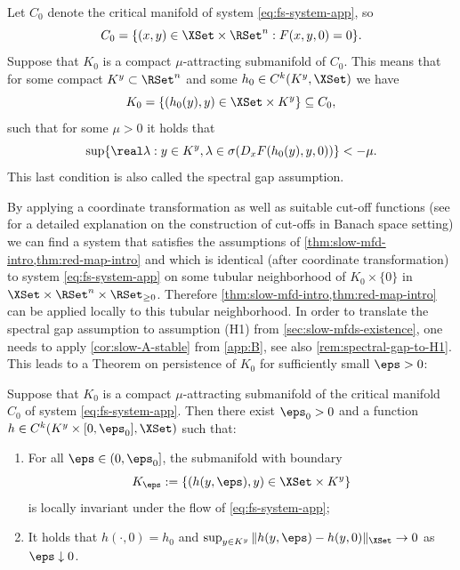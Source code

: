 \documentclass[a4paper]{siamart190516}
\begin{document}
Let $C_0$ denote the critical manifold of system \cref{eq:fs-system-app}, so
\[
C_0 = \{(x,y) \in \XSet \times \RSet^n : F(x,y,0) = 0 \}.
\]
Suppose that $K_0$ is a compact $\mu$-attracting submanifold of $C_0$. This means that  for some compact $K^y \subset \RSet^n$ and some  $h_0 \in C^k(K^y, \XSet)$ we have
\[
K_0 = \{ (h_0(y),y) \in \XSet \times K^y  \} \subseteq C_0,
\]
such that for some $\mu > 0$ it holds that
\[
 \sup \{ \real \lambda : y \in K^y, \lambda  \in \sigma(D_x F(h_0(y),y,0)) \} < -\mu. 
\]
This last condition is also called the spectral gap assumption.

By applying a coordinate transformation as well as suitable cut-off functions (see
\cite{VaIo92} for a detailed explanation on the construction of cut-offs in
Banach space setting) we can find a system that satisfies the assumptions of
\cref{thm:slow-mfd-intro,thm:red-map-intro} and which is identical (after
coordinate transformation) to system \cref{eq:fs-system-app} on some tubular
neighborhood of $K_0 \times \{ 0 \}$ in $\XSet \times \RSet^n \times \RSet_{\geq 0}$.
Therefore \cref{thm:slow-mfd-intro,thm:red-map-intro} can be
applied locally to this tubular neighborhood. In order to translate the spectral gap
assumption to assumption (H1) from \cref{sec:slow-mfds-existence}, one needs to apply
\cref{cor:slow-A-stable} from \cref{app:B}, see also \cref{rem:spectral-gap-to-H1}.
This leads to a Theorem on persistence of $K_0$ for sufficiently small $\eps
>0$: 
 
 \begin{theorem}\label{thm:slow-mfd-app}
Suppose that $K_0$ is a compact $\mu$-attracting submanifold of the critical manifold $C_0$ of system \cref{eq:fs-system-app}. Then there exist $\eps_0 > 0$ and a function $h \in C^k(K^y \times [0,\eps_0], \XSet)$  such that:
\begin{enumerate}
\item For all $\eps \in (0,\eps_0]$, the submanifold with boundary
\[
K_{\eps} := \{ (h(y,\eps),y) \in \XSet \times K^y \}
\]
is locally invariant under the flow of \cref{eq:fs-system-app};
\item It holds that $h(\cdot, 0) = h_0$ and $\sup_{y \in K^y} \| h(y,\eps) - h(y,0) \|_{\XSet} \rightarrow 0$ as $\eps \downarrow 0$.
\end{enumerate}
\end{theorem}
\end{document}

